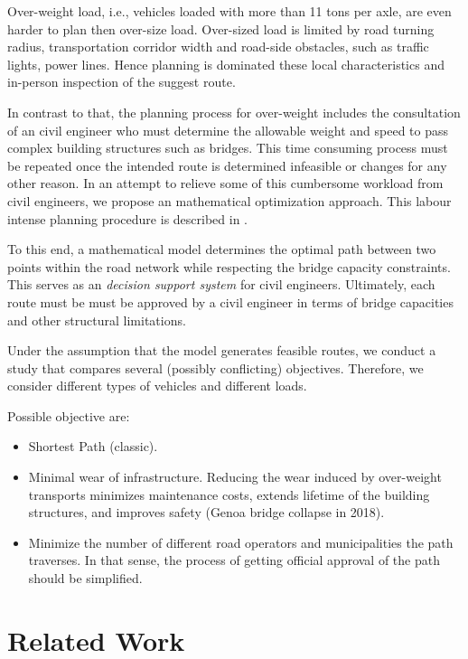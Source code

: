 

Over-weight load, i.e., vehicles loaded with more than 11 tons per axle,
are even harder to plan then over-size load. Over-sized load is limited
by road turning radius, transportation corridor width and road-side obstacles, such as traffic lights, power lines. Hence planning is dominated these local characteristics
and in-person inspection of the suggest route.

In contrast to that, the planning process for over-weight includes the consultation
of an civil engineer who must determine the allowable weight and speed to pass
complex building structures such as bridges.
This time consuming process must be repeated once the intended route is determined infeasible or changes for any other reason.
In an attempt to relieve some of this cumbersome workload from civil engineers,
we propose an mathematical optimization approach.
This labour intense planning procedure is described in
\citet{Osegueda.1999}.

To this end, a mathematical model determines the optimal path between two
points within the road network while respecting the bridge capacity constraints.
This serves as an \textit{decision support system} for civil engineers.
Ultimately,  each route must be must be approved by a civil engineer  in terms of
bridge capacities and other structural limitations.

Under the assumption that the model generates feasible routes,
we conduct a study that compares several (possibly conflicting) objectives.
Therefore, we consider different types of vehicles and different loads.

Possible objective are:
\begin{itemize}
  \item Shortest Path (classic).

  \item Minimal wear of infrastructure. Reducing the wear induced by over-weight transports
  minimizes maintenance costs, extends lifetime of the building structures, and
  improves safety (Genoa bridge collapse in 2018).

  \item Minimize the number of different road operators and municipalities the path
  traverses. In that sense, the process of getting official approval of the
  path should be simplified.
\end{itemize}

\section{Related Work}



